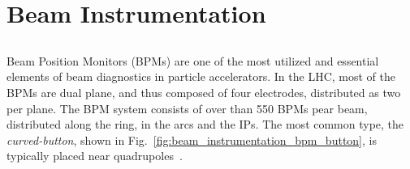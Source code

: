 \section{Beam Instrumentation}


\subsection{}

Beam Position Monitors (BPMs) are one of the most utilized and essential elements of beam 
diagnostics in particle accelerators. In the LHC, most of the BPMs are dual plane, and thus composed
of four electrodes, distributed as two per plane. The BPM system consists of over than 550 BPMs pear
beam, distributed along the ring, in the arcs and the IPs. The most common type, the
\textit{curved-button}, shown in Fig.~\ref{fig:beam_instrumentation_bpm_button}, is typically placed
near quadrupoles~\cite{wendt_bpm_2020}.

